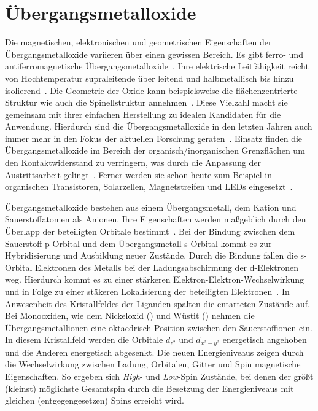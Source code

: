     \section{Übergangsmetalloxide} \label{sec:TMO}
        Die magnetischen, elektronischen und geometrischen Eigenschaften der Übergangsmetalloxide variieren über einen gewissen Bereich.
        Es gibt ferro- und antiferromagnetische Übergangsmetalloxide~\cite{IF_5}.
        Ihre elektrische Leitfähigkeit reicht von Hochtemperatur supraleitende über leitend und halbmetallisch bis hinzu isolierend~\cite{IF_5}.
        Die Geometrie der Oxide kann beispielsweise die flächenzentrierte Struktur wie auch die Spinellstruktur annehmen~\cite{FeO_26}.
        Diese Vielzahl macht sie gemeinsam mit ihrer einfachen Herstellung zu idealen Kandidaten für die Anwendung.        
        Hierdurch sind die Übergangsmetalloxide in den letzten Jahren auch immer mehr in den Fokus der aktuellen Forschung geraten~\cite{IF_6, parkinson_iron_2016, cornell_iron_2003}.
        Einsatz finden die Übergangsmetalloxide im Bereich der organisch/inorganischen Grenzflächen um den Kontaktwiderstand zu verringern, was durch die Anpassung der Austrittsarbeit gelingt~\cite{IF_11, NiO_40}.
        Ferner werden sie schon heute zum Beispiel in organischen Transistoren, Solarzellen, Magnetstreifen und LEDs eingesetzt~\cite{IF_3}.

        Übergangsmetalloxide bestehen aus einem Übergangsmetall, dem Kation und Sauerstoffatomen als Anionen.
        Ihre Eigenschaften werden maßgeblich durch den Überlapp der beteiligten Orbitale bestimmt~\cite{kupper_electronic_2005}.
        Bei der Bindung zwischen dem Sauerstoff p-Orbital und dem Übergangsmetall s-Orbital kommt es zur Hybridisierung und Ausbildung neuer Zustände.
        Durch die Bindung fallen die s-Orbital Elektronen des Metalls bei der Ladungsabschirmung der d-Elektronen weg.
        Hierdurch kommt es zu einer stärkeren Elektron-Elektron-Wechselwirkung und in Folge zu einer stäkeren Lokalisierung der beteiligten Elektronen~\cite{dane_beschreibung_2008}.
        In Anwesenheit des Kristallfeldes der Liganden spalten die entarteten Zustände auf.
        Bei Monooxiden, wie dem Nickeloxid () und Wüstit () nehmen die Übergangsmetallionen eine oktaedrisch Position zwischen den Sauerstoffionen ein.
        In diesem Kristallfeld werden die Orbitale $d_{z^2}$ und $d_{x^2-y^2}$ energetisch angehoben und die Anderen energetisch abgesenkt.
        Die neuen Energieniveaus zeigen durch die Wechselwirkung zwischen Ladung, Orbitalen, Gitter und Spin magnetische Eigenschaften.
        So ergeben sich \textit{High}- und \textit{Low}-Spin Zustände, bei denen der größt (kleinst) möglichste Gesamtspin durch die Besetzung der Energieniveaus mit gleichen (entgegengesetzen) Spins erreicht wird.

